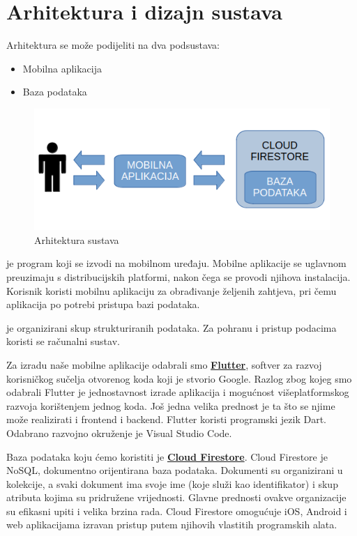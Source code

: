 \chapter{Arhitektura i dizajn sustava}
		
		Arhitektura se može podijeliti na dva podsustava:
	\begin{itemize}
		\item Mobilna aplikacija
		\item Baza podataka
	\end{itemize}
	
	\begin{figure}[h]
		\includegraphics[scale=0.55]{slike/Arhitektura_sustava.PNG}
		\centering
		\caption{Arhitektura sustava}
		\label{fig:Arhitektura_sustava}
	\end{figure}
	
		\textit{} je program koji se izvodi na mobilnom uređaju. Mobilne aplikacije se uglavnom preuzimaju s distribucijskih platformi, nakon čega se provodi njihova instalacija. Korisnik koristi mobilnu aplikaciju za obrađivanje željenih zahtjeva, pri čemu aplikacija po potrebi pristupa bazi podataka.
		
		\textit{} je organizirani skup strukturiranih podataka. Za pohranu i pristup podacima koristi se računalni sustav.
		
		Za izradu naše mobilne aplikacije odabrali smo \href{https://flutter.dev/}{\textbf{Flutter}}, softver za razvoj korisničkog sučelja otvorenog koda koji je stvorio Google. Razlog zbog kojeg smo odabrali Flutter je jednostavnost izrade aplikacija i mogućnost višeplatformskog razvoja korištenjem jednog koda. Još jedna velika prednost je ta što se njime može realizirati i frontend i backend. Flutter koristi programski jezik Dart. Odabrano razvojno okruženje je Visual Studio Code.
		
		Baza podataka koju ćemo koristiti je \href{https://firebase.google.com/docs/firestore}{\textbf{Cloud Firestore}}. Cloud Firestore je NoSQL, dokumentno orijentirana baza podataka. Dokumenti su organizirani u kolekcije, a svaki dokument ima svoje ime (koje služi kao identifikator) i skup atributa kojima su pridružene vrijednosti. Glavne prednosti ovakve organizacije su efikasni upiti i velika brzina rada. Cloud Firestore omogućuje iOS, Android i web aplikacijama izravan pristup putem njihovih vlastitih programskih alata.
		
